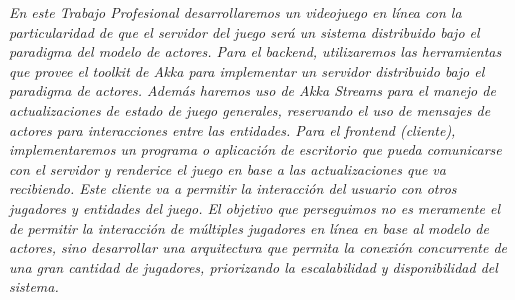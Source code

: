 \textit{
    En este Trabajo Profesional desarrollaremos un videojuego en línea con la particularidad de que el servidor del juego será un sistema distribuido bajo el paradigma del modelo de actores.
Para el backend, utilizaremos las herramientas que provee el toolkit de Akka para implementar un servidor distribuido bajo el paradigma de actores. Además haremos uso de Akka Streams para el manejo de actualizaciones de estado de juego generales, reservando el uso de mensajes de actores para interacciones entre las entidades.
Para el frontend (cliente), implementaremos un programa o aplicación de escritorio que pueda comunicarse con el servidor y renderice el juego en base a las actualizaciones que va recibiendo. Este cliente va a permitir la interacción del usuario con otros jugadores y entidades del juego.
El objetivo que perseguimos no es meramente el de permitir la interacción de múltiples jugadores en línea en base al modelo de actores, sino desarrollar una arquitectura que permita la conexión concurrente de una gran cantidad de jugadores, priorizando la escalabilidad y disponibilidad del sistema.
    }

